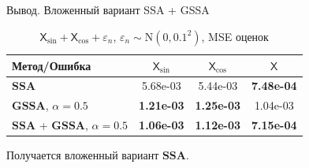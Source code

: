 \documentclass[notheorems, handout]{beamer}
\newcommand{\SSA}{\textbf{SSA}}
\newcommand{\GSSA}{\textbf{GSSA}}
\newcommand{\TS}{\mathsf{X}}
\begin{document}
\begin{frame}{Вывод. Вложенный вариант SSA + GSSA}
	\begin{table}[H]
		\label{tab:errs_ssa_gssa_united}
		\centering
		\caption{$\TS_{\sin} + \TS_{\cos}+
				\varepsilon_n$, $\varepsilon_n \sim \mathrm N(0, 0.1^2)$, MSE оценок }
		\begin{tabular}{l|ccc}
			\hline
			Метод/Ошибка                     & $\TS_{\sin}$      & $\TS_{\cos}$      & $\TS$             \\
			\hline
			$\SSA$                           & 5.68e-03          & 5.44e-03          & \textbf{7.48e-04} \\
			$\GSSA$, $\alpha = 0.5$          & \textbf{1.21e-03} & \textbf{1.25e-03} & 1.04e-03          \\
			\hline
			$\SSA$ + $\GSSA$, $\alpha = 0.5$ & \textbf{1.06e-03} & \textbf{1.12e-03} & \textbf{7.15e-04} \\
			\hline
		\end{tabular}
	\end{table}

	Получается вложенный вариант $\SSA$.

\end{frame}
\end{document}
